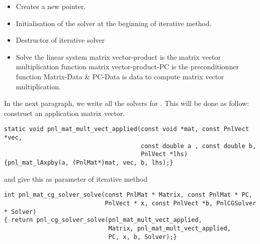 \begin{itemize}
\item {}
  \sshortdescribe Creates a new  pointer.  
\item {}
  \sshortdescribe Initialisation of the solver at the beginning of iterative method.  
\item {}
  \sshortdescribe Destructor of iterative solver  
\item {}
  \sshortdescribe Solve the linear system matrix vector-product is the matrix vector multiplication function matrix vector-product-PC is the preconditionner function Matrix-Data \& PC-Data is data to compute matrix vector multiplication.  
\end{itemize}


In the next paragraph, we write all the solvers for . This will be done as
follow: construct an application matrix vector.
\begin{verbatim}
static void pnl_mat_mult_vect_applied(const void *mat, const PnlVect *vec, 
                                      const double a , const double b, 
                                      PnlVect *lhs)
{pnl_mat_lAxpby(a, (PnlMat*)mat, vec, b, lhs);}
\end{verbatim}
and give this as parameter of iterative method
\begin{verbatim}
int pnl_mat_cg_solver_solve(const PnlMat * Matrix, const PnlMat * PC, 
                            PnlVect * x, const PnlVect *b, PnlCGSolver * Solver)
{ return pnl_cg_solver_solve(pnl_mat_mult_vect_applied, 
                             Matrix, pnl_mat_mult_vect_applied, 
                             PC, x, b, Solver);}
\end{verbatim}

